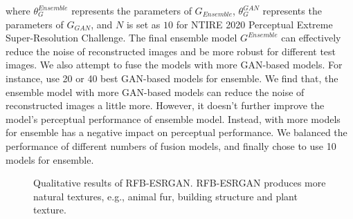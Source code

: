 \documentclass[10pt,twocolumn,letterpaper]{article}
\begin{document}
where $\theta_{G}^{Ensemble}$ represents the parameters of $G_{Ensemble}$, $\theta_G^{GAN}$ represents the parameters of $G_{GAN}$, and $N$ is set as $10$ for NTIRE 2020 Perceptual Extreme Super-Resolution Challenge. The final ensemble model $G^{Ensemble}$ can effectively reduce the noise of reconstructed images and be more robust for different test images. We also attempt to fuse the models with more GAN-based models. For instance, use 20 or 40 best GAN-based models for ensemble. We find that, the ensemble model with more GAN-based models can reduce the noise of reconstructed images a little more. However, it doesn't further improve the model's perceptual performance of ensemble model. Instead, with more models for ensemble has a negative impact on perceptual performance. We balanced the performance of different numbers of fusion models, and finally chose to use 10 models for ensemble.


\begin{figure*}
    \centering
    \hspace{0.005in}
    \hspace{0.005in}
    \hspace{0.005in}
    \hspace{0.005in}
     \vspace{-0.15in}
    \hspace{0.005in}
    \hspace{0.005in}
    \hspace{0.005in}
    \hspace{0.005in}
    \vspace{-0.15in}
    
    
    \caption{Qualitative results of RFB-ESRGAN. RFB-ESRGAN produces more natural textures, e.g., animal fur, building structure and plant texture.}
\label{fig:result1}
\end{figure*}
\end{document}
